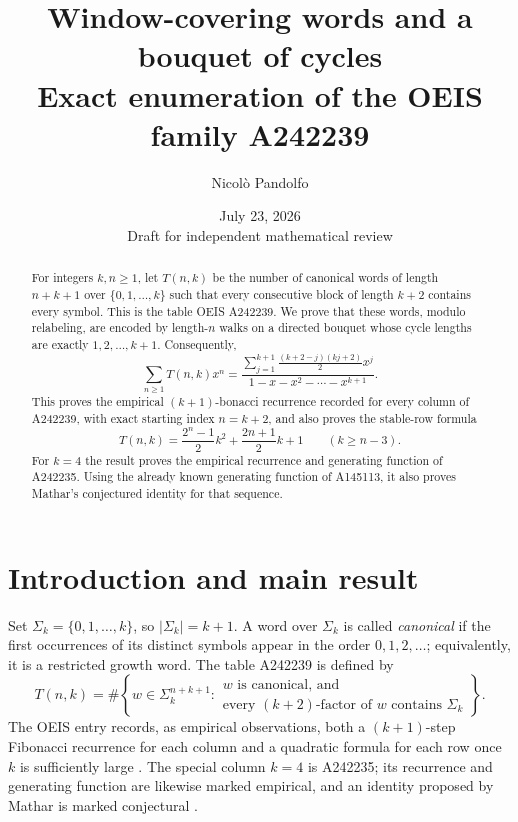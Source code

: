 \documentclass[11pt]{article}
\title{\textbf{Window-covering words and a bouquet of cycles}\\
\large Exact enumeration of the OEIS family A242239}
\author{Nicol\`o Pandolfo}
\date{July 23, 2026\\\small Draft for independent mathematical review}
\theoremstyle{remark}
\newcommand{\SigmaK}{\Sigma_k}
\begin{document}
\maketitle

\begin{abstract}
For integers $k,n\geq 1$, let $T(n,k)$ be the number of canonical words of length
$n+k+1$ over $\{0,1,\ldots,k\}$ such that every consecutive block of length
$k+2$ contains every symbol.  This is the table OEIS A242239.  We prove that
these words, modulo relabeling, are encoded by length-$n$ walks on a directed
bouquet whose cycle lengths are exactly $1,2,\ldots,k+1$.  Consequently,
\[
 \sum_{n\geq 1}T(n,k)x^n
 =\frac{\displaystyle\sum_{j=1}^{k+1}
       \frac{(k+2-j)(kj+2)}{2}x^j}
      {1-x-x^2-\cdots-x^{k+1}}.
\]
This proves the empirical $(k+1)$-bonacci recurrence recorded for every column
of A242239, with exact starting index $n=k+2$, and also proves the stable-row
formula
\[
 T(n,k)=\frac{2^n-1}{2}k^2+\frac{2n+1}{2}k+1
 \qquad (k\geq n-3).
\]
For $k=4$ the result proves the empirical recurrence and generating function
of A242235.  Using the already known generating function of A145113, it also
proves Mathar's conjectured identity for that sequence.
\end{abstract}

\section{Introduction and main result}

Set $\SigmaK=\{0,1,\ldots,k\}$, so $|\SigmaK|=k+1$.  A word over
$\SigmaK$ is called \emph{canonical} if the first occurrences of its distinct
symbols appear in the order $0,1,2,\ldots$; equivalently, it is a restricted
growth word.  The table A242239 is defined by
\begin{equation}\label{eq:defT}
 T(n,k)=\#\left\{
 w\in\SigmaK^{n+k+1}:
 \begin{array}{l}
 w\text{ is canonical, and}\\
 \text{every }(k+2)\text{-factor of }w\text{ contains }\SigmaK
 \end{array}
 \right\}.
\end{equation}
The OEIS entry records, as empirical observations, both a $(k+1)$-step
Fibonacci recurrence for each column and a quadratic formula for each row once
$k$ is sufficiently large \cite{oeisA242239}.  The special column $k=4$ is
A242235; its recurrence and generating function are likewise marked empirical,
and an identity proposed by Mathar is marked conjectural \cite{oeisA242235}.
\end{document}
